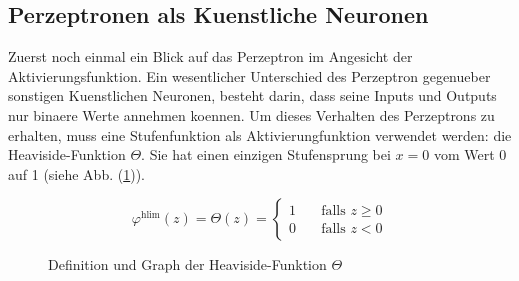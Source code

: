 \subsection{Perzeptronen als Kuenstliche Neuronen}
Zuerst noch einmal ein Blick auf das Perzeptron im Angesicht der Aktivierungsfunktion.
Ein wesentlicher Unterschied des Perzeptron gegenueber sonstigen Kuenstlichen
Neuronen, besteht darin, dass seine Inputs und Outputs nur binaere Werte
annehmen koennen. Um dieses Verhalten des Perzeptrons zu erhalten,
muss eine Stufenfunktion als Aktivierungfunktion verwendet werden: die Heaviside-Funktion $\Theta$.
Sie hat einen einzigen Stufensprung bei $x=0$ vom Wert 0 auf 1 (siehe Abb. (\ref{fig:heaviside})).
\\
\begin{figure}[h!]
  \begin{minipage}[h!]{0.5\textwidth}
    \begin{equation*}
      \varphi^{\text{hlim}}(z) = \Theta(z) =
      \begin{cases}
        1 & \quad \text{falls } z \geq 0\\
        0 & \quad \text{falls } z < 0
      \end{cases}
    \end{equation*}
  \end{minipage}
  \begin{minipage}[h!]{0.5\textwidth}
    \centering
  \end{minipage}
  \caption{Definition und Graph der Heaviside-Funktion $\Theta$}
  \label{fig:heaviside}
\end{figure}


